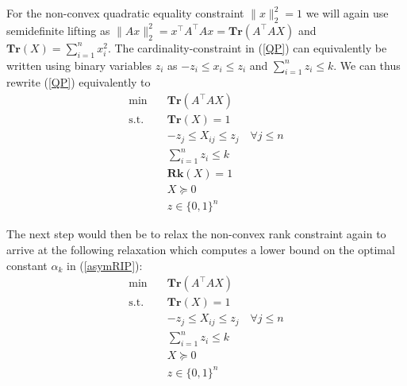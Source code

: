 \documentclass[a4paper,11pt,1p]{elsarticle}
\newcommand{\T}{^{\top}}
\newcommand{\Tr}{\textbf{Tr}}
\newcommand{\Rk}{\textbf{Rk}}
\begin{document}
For the non-convex quadratic equality constraint $\|x\|_2^2 = 1$ we will
again use semidefinite lifting as $\|Ax\|_2^2 = x\T A\T Ax =
\Tr(A\T A X)$ and $\Tr(X) = \sum_{i=1}^n x_i^2$. 
The cardinality-constraint in (\ref{QP}) can equivalently be written using binary variables $z_i$ as $-z_i \leq x_i \leq z_i$ and $\sum_{i=1}^n z_i \leq k$. We can thus rewrite (\ref{QP}) equivalently to
% 
% 
\begin{align}\label{Rk1MISDP}
 \text{min} \quad & \Tr(A\T A X) \nonumber \\
 \text{s.t.} \quad & \Tr(X) = 1 \nonumber \\
 & -z_j \leq X_{ij} \leq z_j \quad \forall j \leq n \nonumber \\
 & \sum_{i=1}^n z_i \leq k \tag{Rk1MISDP} \\
 & \Rk(X) = 1 \nonumber \\
 & X \succeq 0  \nonumber \\
 & z \in \{0,1\}^n \nonumber
\end{align}

The next step would then be to relax the non-convex rank constraint again to arrive at the following relaxation which computes a lower bound on the optimal constant $\alpha_k$ in (\ref{asymRIP}):
\begin{align}\label{MISDP}
 \text{min} \quad & \Tr(A\T A X) \nonumber \\
 \text{s.t.} \quad & \Tr(X) = 1 \nonumber \\
 & -z_j \leq X_{ij} \leq z_j \quad \forall j \leq n \nonumber \\
 & \sum_{i=1}^n z_i \leq k \tag{MISDP} \\
 & X \succeq 0  \nonumber \\
 & z \in \{0,1\}^n \nonumber
\end{align}
\end{document}
